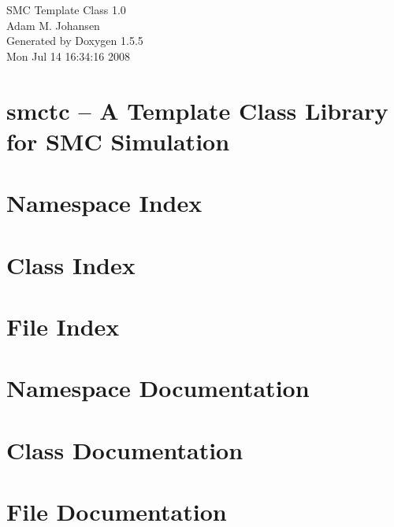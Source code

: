 \documentclass[a4paper]{book}
\begin{document}
\begin{titlepage}
\vspace*{7cm}
\begin{center}
{\Large SMC Template Class 1.0 \\[1ex]\large Adam M. Johansen }\\
\vspace*{1cm}
{Generated by Doxygen 1.5.5}\\
\vspace*{0.5cm}
{\small Mon Jul 14 16:34:16 2008}\\
\end{center}
\end{titlepage}
\clearemptydoublepage
{}
\tableofcontents
\clearemptydoublepage
{}
\chapter{smctc -- A Template Class Library for S\+MC Simulation}
\label{index}\hypertarget{index}{}
\chapter{Namespace Index}

\chapter{Class Index}

\chapter{File Index}

\chapter{Namespace Documentation}


\chapter{Class Documentation}









\chapter{File Documentation}











\backmatter
\newpage
{}
\clearemptydoublepage
{}
\printindex
\end{document}
